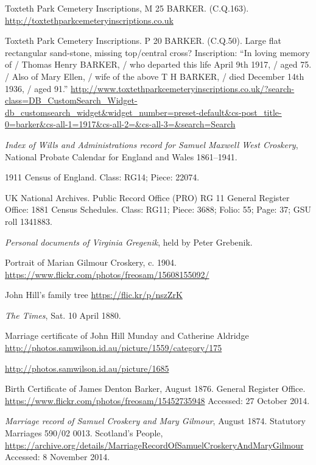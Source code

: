 \begin{thebibliography}{99}
	Toxteth Park Cemetery Inscriptions, M 25 BARKER. (C.Q.163). \url{http://toxtethparkcemeteryinscriptions.co.uk}

	Toxteth Park Cemetery Inscriptions. P 20 BARKER. (C.Q.50).
	Large flat rectangular sand-stone, missing top/central cross? Inscription:
	``In loving memory of / Thomas Henry BARKER, / who departed this life April 9th 1917, / aged 75. /
	Also of Mary Ellen, / wife of the above T H BARKER, / died December 14th 1936, / aged 91.''
	\url{http://www.toxtethparkcemeteryinscriptions.co.uk/?search-class=DB_CustomSearch_Widget-db_customsearch_widget&widget_number=preset-default&cs-post_title-0=barker&cs-all-1=1917&cs-all-2=&cs-all-3=&search=Search}

	\emph{Index of Wills and Administrations record for Samuel Maxwell West Croskery},
	National Probate Calendar for England and Wales 1861--1941.

	1911 Census of England. Class: RG14; Piece: 22074.

	UK National Archives. Public Record Office (PRO) RG 11 General Register Office: 1881 Census Schedules.
	Class: RG11; Piece: 3688; Folio: 55; Page: 37; GSU roll 1341883.

	\emph{Personal documents of Virginia Gregenik}, held by Peter Grebenik.

	Portrait of Marian Gilmour Croskery, c. 1904.
	\url{https://www.flickr.com/photos/freosam/15608155092/}

	John Hill's family tree \url{https://flic.kr/p/nszZrK}

	\emph{The Times}, Sat. 10 April 1880. 

	Marriage certificate of John Hill Munday and Catherine Aldridge
	\url{http://photos.samwilson.id.au/picture/1559/category/175}

	\url{http://photos.samwilson.id.au/picture/1685}

	Birth Certificate of James Denton Barker, August 1876. General Register Office.
	\url{https://www.flickr.com/photos/freosam/15452735948}
	Accessed: 27 October 2014.

	\emph{Marriage record of Samuel Croskery and Mary Gilmour}, August 1874.
	Statutory Marriages 590/02 0013. Scotland's People,
	\url{https://archive.org/details/MarriageRecordOfSamuelCroskeryAndMaryGilmour}
	Accessed: 8 November 2014.


\end{thebibliography}
